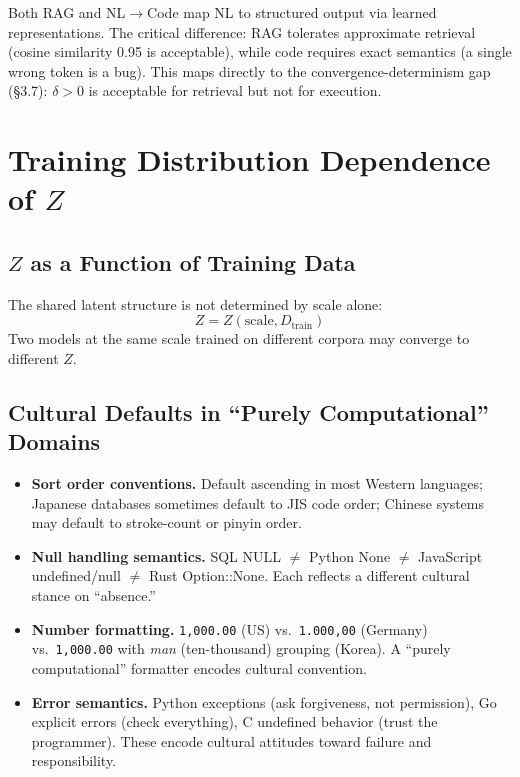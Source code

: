 \documentclass[11pt]{article}
\theoremstyle{definition}
\newcommand{\Dtrain}{D_{\text{train}}}
\begin{document}
Both RAG and NL$\to$Code map NL to structured output via learned representations. The critical difference: RAG tolerates approximate retrieval (cosine similarity 0.95 is acceptable), while code requires exact semantics (a single wrong token is a bug). This maps directly to the convergence-determinism gap (\S3.7): $\delta > 0$ is acceptable for retrieval but not for execution.

\section{Training Distribution Dependence of $Z$}\label{app:dtrain}

\subsection{$Z$ as a Function of Training Data}

The shared latent structure is not determined by scale alone:
\[
Z = Z(\text{scale}, \Dtrain)
\]
Two models at the same scale trained on different corpora may converge to different $Z$.

\subsection{Cultural Defaults in ``Purely Computational'' Domains}

\begin{itemize}[nosep]
  \item \textbf{Sort order conventions.} Default ascending in most Western languages; Japanese databases sometimes default to JIS code order; Chinese systems may default to stroke-count or pinyin order.
  \item \textbf{Null handling semantics.} SQL NULL $\neq$ Python None $\neq$ JavaScript undefined/null $\neq$ Rust Option::None. Each reflects a different cultural stance on ``absence.''
  \item \textbf{Number formatting.} \texttt{1,000.00} (US) vs.\ \texttt{1.000,00} (Germany) vs.\ \texttt{1,000.00} with \emph{man} (ten-thousand) grouping (Korea). A ``purely computational'' formatter encodes cultural convention.
  \item \textbf{Error semantics.} Python exceptions (ask forgiveness, not permission), Go explicit errors (check everything), C undefined behavior (trust the programmer). These encode cultural attitudes toward failure and responsibility.
\end{itemize}
\end{document}
